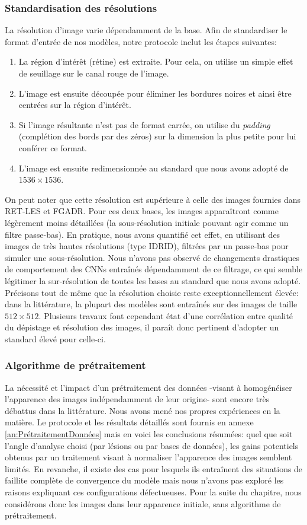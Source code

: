 \subsubsection{Standardisation des résolutions}
\label{sec:resolution_standardisation}
La résolution d'image varie dépendamment de la base. Afin de standardiser le format d'entrée de nos modèles, notre protocole inclut les étapes suivantes:
\begin{enumerate}
	\item La région d'intérêt (rétine) est extraite. Pour cela, on utilise un simple effet de seuillage sur le canal rouge de l'image.
	\item L'image est ensuite découpée pour éliminer les bordures noires et ainsi être centrées sur la région d'intérêt.
	\item Si l'image résultante n'est pas de format carrée, on utilise du \textit{padding} (complétion des bords par des zéros) sur la dimension la plus petite pour lui conférer ce format.
	\item L'image est ensuite redimensionnée au standard que nous avons adopté de $1536 \times 1536$.
\end{enumerate}
On peut noter que cette résolution est supérieure à celle des images fournies dans RET-LES et FGADR. Pour ces deux bases, les images apparaîtront comme légèrement moins détaillées (la sous-résolution initiale pouvant agir comme un filtre passe-bas). En pratique, nous avons quantifié cet effet, en utilisant des images de très hautes résolutions (type IDRID), filtrées par un passe-bas pour simuler une sous-résolution. Nous n'avons pas observé de changements drastiques de comportement des CNNs entraînés dépendamment de ce filtrage, ce qui semble légitimer la sur-résolution de toutes les bases au standard que nous avons adopté. Précisons tout de même que la résolution choisie reste exceptionnellement élevée: dans la littérature, la plupart des modèles sont entraînés sur des images de taille $512 \times 512$. Plusieurs travaux font cependant état d'une corrélation entre qualité du dépistage et résolution des images, il paraît donc pertinent d'adopter un standard élevé pour celle-ci.
\subsubsection{Algorithme de prétraitement}
\label{sec:preprocessingQuick}
La nécessité et l'impact d'un prétraitement des données -visant à homogénéiser l'apparence des images indépendamment de leur origine- sont encore très débattus dans la littérature. Nous avons mené nos propres expériences en la matière. Le protocole et les résultats détaillés sont fournis en annexe \ref{an:PrétraitementDonnées} mais en voici les conclusions résumées:  quel que soit l'angle d'analyse choisi (par lésions ou par bases de données), les gains potentiels obtenus par un traitement visant à normaliser l'apparence des images semblent limités. En revanche, il existe des cas pour lesquels ils entraînent des situations de faillite complète de convergence du modèle mais nous n'avons pas exploré les raisons expliquant ces configurations défectueuses. Pour la suite du chapitre, nous considérons donc les images dans leur apparence initiale, sans algorithme de prétraitement.

